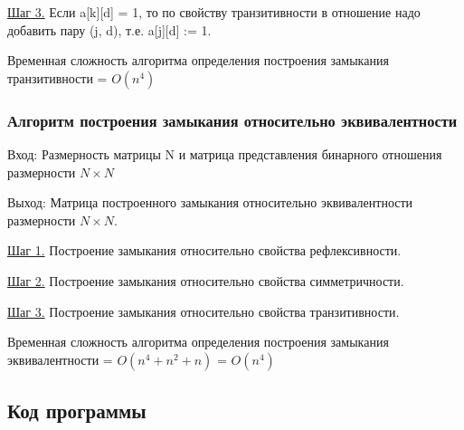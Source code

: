 \documentclass[bachelor, och, labwork]{shiza}
\begin{document}
	\underline{Шаг 3.} Если a[k][d] = 1, то по свойству транзитивности в отношение надо добавить пару (j, d), т.е. a[j][d] := 1.
	
	Временная сложность алгоритма определения построения замыкания транзитивности = $O(n^4)$
	
	\subsubsection{Алгоритм построения замыкания относительно эквивалентности}

	$\textit{Вход:}$ Размерность матрицы N и матрица представления бинарного отношения размерности $N \times N$
	
	$\textit{Выход:}$  Матрица построенного замыкания относительно эквивалентности размерности $N \times N$.
	
	\underline{Шаг 1.} Построение замыкания относительно свойства рефлексивности.
	
	\underline{Шаг 2.} Построение замыкания относительно свойства симметричности.
		
	\underline{Шаг 3.} Построение замыкания относительно свойства транзитивности.
	
	Временная сложность алгоритма определения построения замыкания эквивалентности = $O(n^4 + n^2 + n)$ = $O(n^4)$
		
	
	
	\subsection{Код программы}		
	
\end{document}

